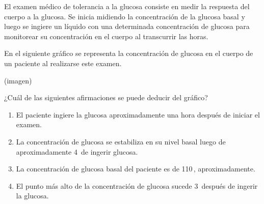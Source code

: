 \begin{problem}
    El examen médico de tolerancia a la glucosa consiste en medir la respuesta del cuerpo a la glucosa. Se inicia midiendo la concentración de la glucosa basal y luego se ingiere un líquido con una determinada concentración de glucosa para monitorear su concentración en el cuerpo al transcurrir las horas.

    En el siguiente gráfico se representa la concentración de glucosa en el cuerpo de un paciente al realizarse este examen.

    \begin{center}
    (imagen)
    \end{center}

    ¿Cuál de las siguientes afirmaciones se puede deducir del gráfico?

    \begin{enumerate}[label=\Alph*.]
        \item El paciente ingiere la glucosa aproximadamente una hora después de iniciar el examen.
        \item La concentración de glucosa se estabiliza en su nivel basal luego de aproximadamente 4\, de ingerir glucosa.
        \item La concentración de glucosa basal del paciente es de 110\,, aproximadamente.
        \item El punto más alto de la concentración de glucosa sucede 3\, después de ingerir la glucosa.
    \end{enumerate}
\end{problem}
